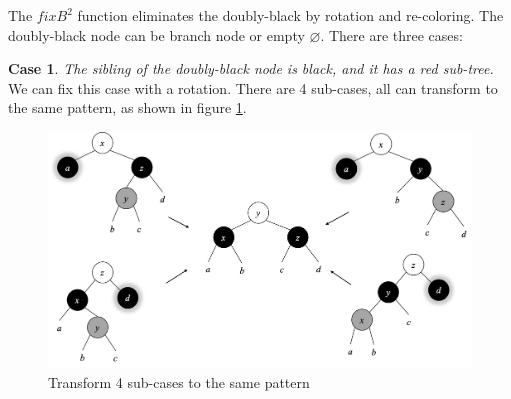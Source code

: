 \documentclass[b5paper]{article}
\begin{document}
The $fixB^2$ function eliminates the doubly-black by rotation and re-coloring. The doubly-black node can be branch node or empty $\pmb{\varnothing}$. There are three cases:

\textbf{Case 1}. {\em The sibling of the doubly-black node is black, and it has a red sub-tree.} We can fix this case with a rotation. There are 4 sub-cases, all can transform to the same pattern, as shown in figure \cref{fig:del-case1}.

\begin{figure}[htbp]
  \centering
  \includegraphics[scale=0.4]{img/del-case1}
  \caption{Transform 4 sub-cases to the same pattern}
  \label{fig:del-case1}
\end{figure}

\be
{}
\label{eq:db-case-1}
\ee
\end{document}
